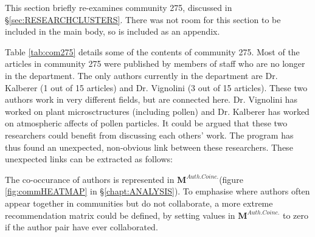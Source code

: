 \label{sec:neonicotinoids}
This section briefly re-examines community 275, discussed in \S\ref{sec:RESEARCHCLUSTERS}. There was not room for this section to be included in the main body, so is included as an appendix. 

Table \ref{tab:com275} details some of the contents of community 275. Most of the articles in community 275 were published by members of staff who are no longer in the department. The only authors currently in the department are Dr. Kalberer (1 out of 15 articles) and Dr. Vignolini (3 out of 15 articles). These two authors work in very different fields, but are connected here. Dr. Vignolini has worked on plant microsctructures (including pollen) and Dr. Kalberer has worked on atmospheric affects of pollen particles. It could be argued that these two researchers could benefit from discussing each others' work. The program has thus found an unexpected, non-obvious link between these researchers. These unexpected links can be extracted as follows:

The co-occurance of authors is represented in $\mathbf{M}^{Auth. Coinc.}$(figure \ref{fig:commHEATMAP} in \S\ref{chapt:ANALYSIS}). To emphasise where authors often appear together in communities but do not collaborate, a more extreme recommendation matrix could be defined, by setting values in $\mathbf{M}^{Auth. Coinc.}$ to zero if the author pair have ever collaborated. 

